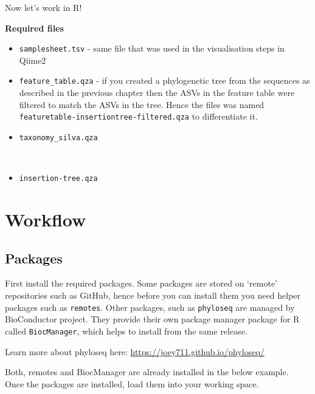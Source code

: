 \documentclass[
]{book}
\begin{document}
Now let's work in R!

\textbf{Required files}

\begin{itemize}
\item
  \texttt{samplesheet.tsv} - same file that was used in the visualisation steps in Qiime2\\
\item
  \texttt{feature\_table.qza} - if you created a phylogenetic tree from the sequences as described in the previous chapter then the ASVs in the feature table were filtered to match the ASVs in the tree. Hence the files was named \texttt{featuretable-insertiontree-filtered.qza} to differentiate it.\\
\item
  \texttt{taxonomy\_silva.qza}\strut \\
\item
  \texttt{insertion-tree.qza}

  \hfill\break
\end{itemize}

\hypertarget{workflow-2}{%
\section{Workflow}\label{workflow-2}}

\hypertarget{packages}{%
\subsection{Packages}\label{packages}}

First install the required packages. Some packages are stored on `remote' repositories such as GitHub, hence before you can install them you need helper packages such as \texttt{remotes}. Other packages, such as \texttt{phyloseq} are managed by BioConductor project. They provide their own package manager package for R called \texttt{BiocManager}, which helps to install from the same release.

Learn more about phyloseq here: \url{https://joey711.github.io/phyloseq/}

Both, remotes and BiocManager are already installed in the below example.\\
Once the packages are installed, load them into your working space.
\end{document}
